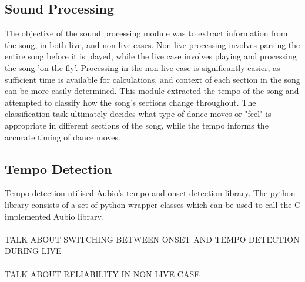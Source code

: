 \subsection{Sound Processing}



The objective of the sound processing module was to extract information from the song, in both live, and non live cases. Non live processing involves parsing the entire song before it is played, while the live case involves playing and processing the song 'on-the-fly'. Processing in the non live case is significantly easier, as sufficient time is available for calculations, and context of each section in the song can be more easily determined. This module extracted the tempo of the song and attempted to classify how the song's sections change throughout. The classification task ultimately decides what type of dance moves or "feel" is appropriate in different sections of the song, while the tempo informs the accurate timing of dance moves.

\subsection{Tempo Detection}
Tempo detection utilised Aubio's tempo and onset detection library. The python library consists of a set of python wrapper classes which can be used to call the C implemented Aubio library. \\
\\
TALK ABOUT SWITCHING BETWEEN ONSET AND TEMPO DETECTION DURING LIVE\\
\\
TALK ABOUT RELIABILITY IN NON LIVE CASE

